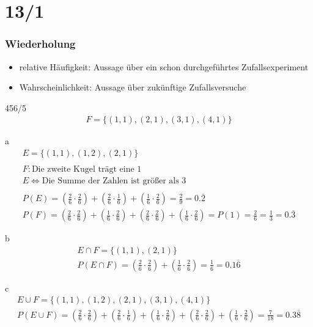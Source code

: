 \part{13/1}

\section{Wiederholung}
\begin{itemize}
  \item relative Häufigkeit: Aussage über ein schon durchgeführtes Zufallsexperiment
  \item Wahrscheinlichkeit: Aussage über zukünftige Zufallsversuche
\end{itemize}
\begin{exercise}{456/5}
  \begin{gather*}
    F = \{(1, 1), (2, 1), (3, 1), (4, 1)\}
  \end{gather*}
  \item [a]
  \begin{gather*}
    E = \{(1, 1), (1, 2), (2, 1)\} \\\\
    F \colon \text{Die zweite Kugel trägt eine $1$} \\
    E \Leftrightarrow \text{Die Summe der Zahlen ist größer als $3$} \\\\
    P(E) = (\frac{2}{6} \cdot \frac{2}{6}) + (\frac{2}{6} \cdot \frac{1}{6}) + (\frac{1}{6} \cdot \frac{2}{6}) = \frac{2}{9} = 0.\overline{2} \\
    P(F) = (\frac{2}{6} \cdot \frac{2}{6}) + (\frac{1}{6} \cdot \frac{2}{6}) + (\frac{2}{6} \cdot \frac{2}{6}) + (\frac{1}{6} \cdot \frac{2}{6}) = P(1) = \frac{2}{6} = \frac{1}{3} = 0.\overline{3}
  \end{gather*}
  \item [b]
  \begin{gather*}
    E \cap F = \{(1, 1), (2, 1)\} \\
    P(E \cap F) = (\frac{2}{6} \cdot \frac{2}{6}) + (\frac{1}{6} \cdot \frac{2}{6}) = \frac{1}{6} = 0.1\overline{6}
  \end{gather*}
  \item [c]
  \begin{gather*}
    E \cup F = \{(1, 1), (1, 2), (2, 1), (3, 1), (4, 1)\} \\
    P(E \cup F) = (\frac{2}{6} \cdot \frac{2}{6}) + (\frac{2}{6} \cdot \frac{1}{6}) + (\frac{1}{6} \cdot \frac{2}{6}) + (\frac{2}{6} \cdot \frac{2}{6}) + (\frac{1}{6} \cdot \frac{2}{6}) = \frac{7}{18} = 0.3\overline{8}
  \end{gather*}
\end{exercise}
